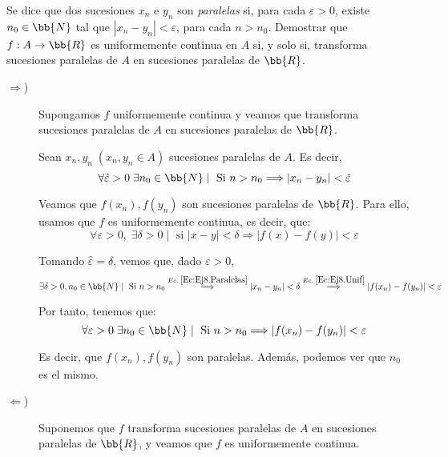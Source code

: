 \begin{ejercicio}
    Se dice que dos sucesiones $x_n$ e $y_n$ son \emph{paralelas} si, para cada $\varepsilon > 0$, existe $n_0\in \bb{N}$ tal que $|x_n - y_n| < \varepsilon$, para cada $n>n_0$. Demostrar que $f:A\to \bb{R}$ es uniformemente continua en $A$ si, y solo si, transforma sucesiones paralelas de $A$ en sucesiones paralelas de $\bb{R}$.

    \begin{description}
        \item [$\Longrightarrow$)] Supongamos $f$ uniformemente continua y veamos que transforma sucesiones paralelas de $A$ en sucesiones paralelas de $\bb{R}$.

        Sean $x_n,y_n\;(x_n,y_n\in A)$ sucesiones paralelas de $A$. Es decir,
        \begin{equation}\label{Ec:Ej8.Paralelas}
            \forall \hat{\varepsilon} >0\; \exists n_0\in \bb{N}\mid \text{ Si } n>n_0 \Longrightarrow |x_n - y_n| < \hat{\varepsilon}
        \end{equation}

        Veamos que $f(x_n),f(y_n)$ son sucesiones paralelas de $\bb{R}$. Para ello, usamos que $f$ es uniformemente continua, es decir, que:
        \begin{equation}\label{Ec:Ej8.Unif}
            \forall \varepsilon>0,\;\exists \delta>0 \mid  \text{ si } |x-y|<\delta \Longrightarrow |f(x)-f(y)| < \varepsilon
        \end{equation}

        Tomando $\hat{\varepsilon} = \delta$, vemos que, dado $\varepsilon>0$,
        \begin{equation*}
            \exists \delta>0,n_0\in \bb{N} \mid \text{ Si } n>n_0
            \stackrel{Ec.\;\ref{Ec:Ej8.Paralelas}}{\Longrightarrow}
            |x_n-y_n| < \delta
            \stackrel{Ec.\;\ref{Ec:Ej8.Unif}}{\Longrightarrow}
            |f(x_n) - f(y_n)| < \varepsilon
        \end{equation*}

        Por tanto, tenemos que:
        \begin{equation*}
            \forall \varepsilon >0\; \exists n_0\in \bb{N}\mid \text{ Si } n>n_0 \Longrightarrow |f(x_n) - f(y_n)| < \varepsilon
        \end{equation*}

        Es decir, que $f(x_n),f(y_n)$ son paralelas. Además, podemos ver que $n_0$ es el mismo.

        \item [$\Longleftarrow$)] Suponemos que $f$ transforma sucesiones paralelas de $A$ en sucesiones paralelas de $\bb{R}$, y veamos que $f$ es uniformemente continua.


\end{description}
\end{ejercicio}
